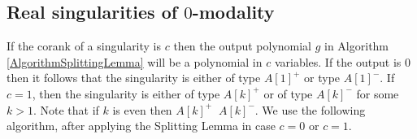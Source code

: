 \documentclass{amsproc}
\DeclareMathOperator{\requiv}{\overset{r}{\sim}}
\begin{document}
\subsection{Real singularities of $0$-modality}

If the corank of a singularity is $c$ then the output polynomial $g$ in
Algorithm \ref{AlgorithmSplittingLemma} will be a polynomial in $c$ variables.
If the output is $0$ then it follows  that the singularity is either of type
$A[1]^+$ or type $A[1]^-$. If $c=1$, then the singularity is either of type
$A[k]^+$ or of type $A[k]^-$ for some $k>1$. Note that if $k$ is even then
$A[k]^+\requiv A[k]^-$. We use the following algorithm, after applying the
Splitting Lemma in case $c=0$ or $c=1$.
\end{document}
